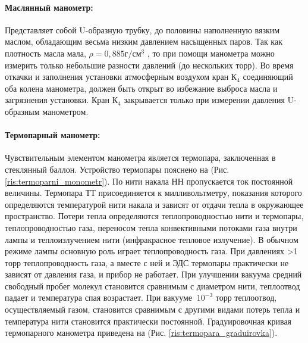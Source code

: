 \documentclass[a4paper, 12pt]{article}
\begin{document}
    \paragraph{Маслянный манометр:}
    Представляет собой U-образную трубку, до половины наполненную вязким маслом, обладающим весьма низким давлением насыщенных паров. Так как плотность масла мала, $\rho = 0,885 г/см^3$ , то при помощи манометра можно измерить только небольшие разности давлений (до нескольких торр). Во время откачки и заполнения установки атмосферным воздухом кран $К_4$ соединяющий оба колена манометра, должен быть открыт во избежание выброса масла и загрязнения установки. Кран $К_4$ закрывается только при измерении давления U-образным манометром.


    \newpage

    \paragraph{Термопарный манометр:}
    Чувствительным элементом манометра является термопара, заключенная в стеклянный баллон. Устройство термопары пояснено на (Рис. \ref{ris:termoparni_monometr}). По нити накала НН пропускается ток постоянной величины. Термопара ТТ присоединяется к милливольтметру, показания которого определяются температурой нити накала и зависят от отдачи тепла в окружающее пространство. Потери тепла определяются теплопроводностью нити и термопары, теплопроводностью газа, переносом тепла конвективными потоками газа внутри лампы и теплоизлучением нити (инфракрасное тепловое излучение). В обычном режиме лампы основную роль играет теплопроводность газа. При давлениях >1 торр теплопроводность газа, а вместе с ней и ЭДС термопары практически не зависят от давления газа, и прибор не работает. При улучшении вакуума средний свободный пробег молекул становится сравнимым с диаметром нити, теплоотвод падает и температура спая возрастает. При вакууме $~10^{-3}$ торр теплоотвод, осуществляемый газом, становится сравнимым с другими видами потерь тепла и температура нити становится практически постоянной. Градуировочная кривая термопарного манометра приведена на (Рис. \ref{ris:termopara_graduirovka}).
\end{document}
